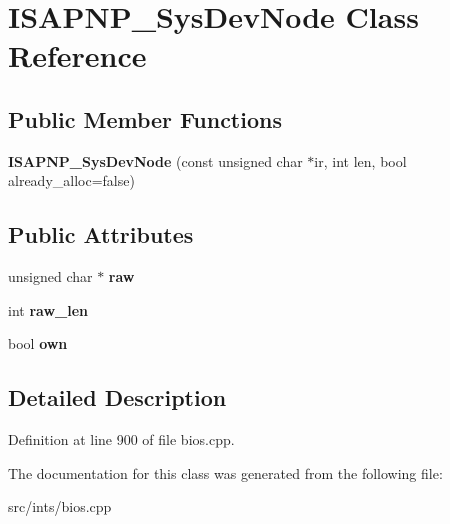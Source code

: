 \hypertarget{classISAPNP__SysDevNode}{\section{I\-S\-A\-P\-N\-P\-\_\-\-Sys\-Dev\-Node Class Reference}
\label{classISAPNP__SysDevNode}
}
\subsection*{Public Member Functions}
\begin{DoxyCompactItemize}
\item 
\hypertarget{classISAPNP__SysDevNode_a47c785303972c311bc4c4c4d2cbd1775}{{\bfseries I\-S\-A\-P\-N\-P\-\_\-\-Sys\-Dev\-Node} (const unsigned char $\ast$ir, int len, bool already\-\_\-alloc=false)}\label{classISAPNP__SysDevNode_a47c785303972c311bc4c4c4d2cbd1775}

\end{DoxyCompactItemize}
\subsection*{Public Attributes}
\begin{DoxyCompactItemize}
\item 
\hypertarget{classISAPNP__SysDevNode_a88b23d674e4b48999a46d838dff47b7b}{unsigned char $\ast$ {\bfseries raw}}\label{classISAPNP__SysDevNode_a88b23d674e4b48999a46d838dff47b7b}

\item 
\hypertarget{classISAPNP__SysDevNode_a54a974b2d45d1c820976e572eafb3dc4}{int {\bfseries raw\-\_\-len}}\label{classISAPNP__SysDevNode_a54a974b2d45d1c820976e572eafb3dc4}

\item 
\hypertarget{classISAPNP__SysDevNode_a0a342171b0ed0789f665868c14e9e6cc}{bool {\bfseries own}}\label{classISAPNP__SysDevNode_a0a342171b0ed0789f665868c14e9e6cc}

\end{DoxyCompactItemize}


\subsection{Detailed Description}


Definition at line 900 of file bios.\-cpp.



The documentation for this class was generated from the following file\-:\begin{DoxyCompactItemize}
\item 
src/ints/bios.\-cpp\end{DoxyCompactItemize}
